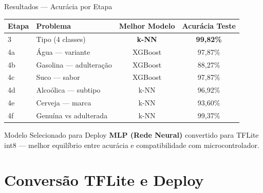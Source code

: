 \documentclass[aspectratio=169, 11pt]{beamer}
\begin{document}
\begin{frame}{Resultados — Acurácia por Etapa}
  \begin{center}
    \begin{tabular}{llcc}
      \toprule
      \textbf{Etapa} & \textbf{Problema} & \textbf{Melhor Modelo} & \textbf{Acurácia Teste} \\
      \midrule
      3  & Tipo (4 classes)         & \textbf{k-NN}     & \textcolor{green!50!black}{\textbf{99,82\%}} \\
      4a & Água — variante          & XGBoost            & 97,87\% \\
      4b & Gasolina — adulteração   & XGBoost            & 88,27\% \\
      4c & Suco — sabor             & XGBoost            & 97,87\% \\
      4d & Alcoólica — subtipo      & k-NN               & 96,92\% \\
      4e & Cerveja — marca          & k-NN               & 93,60\% \\
      4f & Genuína vs adulterada    & k-NN               & 99,37\% \\
      \bottomrule
    \end{tabular}
  \end{center}
  \vspace{0.5cm}
  \begin{block}{Modelo Selecionado para Deploy}
    \textbf{MLP (Rede Neural)} convertido para TFLite int8 — melhor equilíbrio entre acurácia e compatibilidade com microcontrolador.
  \end{block}
\end{frame}

\section{Conversão TFLite e Deploy}
\end{document}
